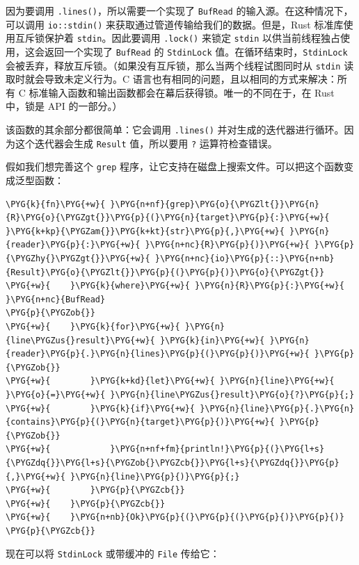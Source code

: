 因为要调用 \texttt{.lines()}，所以需要一个实现了 \texttt{BufRead} 的输入源。在这种情况下，可以调用 \texttt{io::stdin()} 来获取通过管道传输给我们的数据。但是，Rust 标准库使用互斥锁保护着 \texttt{stdin}。因此要调用 \texttt{.lock()} 来锁定 \texttt{stdin} 以供当前线程独占使用，这会返回一个实现了 \texttt{BufRead} 的 \texttt{StdinLock} 值。在循环结束时，\texttt{StdinLock} 会被丢弃，释放互斥锁。（如果没有互斥锁，那么当两个线程试图同时从 \texttt{stdin} 读取时就会导致未定义行为。C 语言也有相同的问题，且以相同的方式来解决：所有 C 标准输入函数和输出函数都会在幕后获得锁。唯一的不同在于，在 Rust 中，锁是 API 的一部分。）

该函数的其余部分都很简单：它会调用 \texttt{.lines()} 并对生成的迭代器进行循环。因为这个迭代器会生成 \texttt{Result} 值，所以要用 \texttt{?} 运算符检查错误。

假如我们想完善这个 \texttt{grep} 程序，让它支持在磁盘上搜索文件。可以把这个函数变成泛型函数：

\begin{Verbatim}[commandchars=\\\{\},breaklines=true,breakanywhere=true,fontsize=\codefont,xleftmargin=17bp]
\PYG{k}{fn}\PYG{+w}{ }\PYG{n+nf}{grep}\PYG{o}{\PYGZlt{}}\PYG{n}{R}\PYG{o}{\PYGZgt{}}\PYG{p}{(}\PYG{n}{target}\PYG{p}{:}\PYG{+w}{ }\PYG{k+kp}{\PYGZam{}}\PYG{k+kt}{str}\PYG{p}{,}\PYG{+w}{ }\PYG{n}{reader}\PYG{p}{:}\PYG{+w}{ }\PYG{n+nc}{R}\PYG{p}{)}\PYG{+w}{ }\PYG{p}{\PYGZhy{}\PYGZgt{}}\PYG{+w}{ }\PYG{n+nc}{io}\PYG{p}{::}\PYG{n+nb}{Result}\PYG{o}{\PYGZlt{}}\PYG{p}{(}\PYG{p}{)}\PYG{o}{\PYGZgt{}}
\PYG{+w}{    }\PYG{k}{where}\PYG{+w}{ }\PYG{n}{R}\PYG{p}{:}\PYG{+w}{ }\PYG{n+nc}{BufRead}
\PYG{p}{\PYGZob{}}
\PYG{+w}{    }\PYG{k}{for}\PYG{+w}{ }\PYG{n}{line\PYGZus{}result}\PYG{+w}{ }\PYG{k}{in}\PYG{+w}{ }\PYG{n}{reader}\PYG{p}{.}\PYG{n}{lines}\PYG{p}{(}\PYG{p}{)}\PYG{+w}{ }\PYG{p}{\PYGZob{}}
\PYG{+w}{        }\PYG{k+kd}{let}\PYG{+w}{ }\PYG{n}{line}\PYG{+w}{ }\PYG{o}{=}\PYG{+w}{ }\PYG{n}{line\PYGZus{}result}\PYG{o}{?}\PYG{p}{;}
\PYG{+w}{        }\PYG{k}{if}\PYG{+w}{ }\PYG{n}{line}\PYG{p}{.}\PYG{n}{contains}\PYG{p}{(}\PYG{n}{target}\PYG{p}{)}\PYG{+w}{ }\PYG{p}{\PYGZob{}}
\PYG{+w}{            }\PYG{n+nf+fm}{println!}\PYG{p}{(}\PYG{l+s}{\PYGZdq{}}\PYG{l+s}{\PYGZob{}\PYGZcb{}}\PYG{l+s}{\PYGZdq{}}\PYG{p}{,}\PYG{+w}{ }\PYG{n}{line}\PYG{p}{)}\PYG{p}{;}
\PYG{+w}{        }\PYG{p}{\PYGZcb{}}
\PYG{+w}{    }\PYG{p}{\PYGZcb{}}
\PYG{+w}{    }\PYG{n+nb}{Ok}\PYG{p}{(}\PYG{p}{(}\PYG{p}{)}\PYG{p}{)}
\PYG{p}{\PYGZcb{}}
\end{Verbatim}

现在可以将 \texttt{StdinLock} 或带缓冲的 \texttt{File} 传给它：

